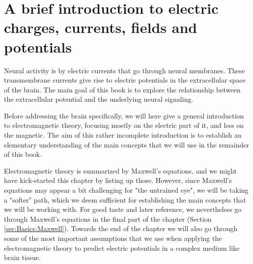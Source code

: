 \chapter{A brief introduction to electric charges, currents, fields and potentials}
\label{chap:Basics}

Neural activity is  by electric currents that go through neural membranes. 
These transmembrane currents give rise to electric potentials in the extracellular space of the brain. The main goal of this book is to explore the relationship between the extracellular potential and the underlying neural signaling. 

Before addressing the brain specifically, we will here give a general introduction to electromagnetic theory, focusing mostly on the electric part of it, and less on the magnetic. The aim of this rather incomplete introduction is to establish an elementary understanding of the main concepts that we will use in the remainder of this book.

Electromagnetic theory is summarized by Maxwell's equations, and we might have kick-started this chapter by listing up those. However, since Maxwell's equations may appear a bit challenging for "the untrained eye", we will be taking a "softer" path, which we deem sufficient for establishing the main concepts that we will be working with. For good taste and later reference, we nevertheless go through Maxwell's equations in the final part of the chapter (Section \ref{sec:Basics:Maxwell}). Towards the end of the chapter we will also go through some of the most important assumptions that we use when applying the electromagnetic theory to predict electric potentials in a complex medium like brain tissue.

